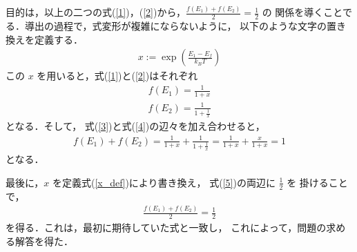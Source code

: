                 目的は，以上の二つの式(\ref{1})，(\ref{2})から，$\displaystyle\frac{f(E_{1})+f(E_{2})}{2}=\frac{1}{2}$ の
                関係を導くことでる．導出の過程で，式変形が複雑にならないように，
                以下のような文字の置き換えを定義する．
                \begin{align}\label{x_def}
                x:=\exp\left(\frac{E_{1}-E_{f}}{k_{B}T}\right)
                \end{align}
                この $x$ を用いると，式(\ref{1})と(\ref{2})はそれぞれ
                \begin{align}\label{3}
                f(E_{1})=\frac{1}{1+x}
                \end{align}
                \begin{align}\label{4}
                f(E_{2})=\frac{1}{1+\frac{1}{x}}
                \end{align}
                となる．そして，
                式(\ref{3})と式(\ref{4})の辺々を加え合わせると，
                \begin{align}\label{5}
                f(E_{1})+f(E_{2})=\frac{1}{1+x}+\frac{1}{1+\frac{1}{x}}=\frac{1}{1+x}+\frac{x}{1+x}=1
                \end{align}
                となる．

                最後に，$x$ を定義式(\ref{x_def})により書き換え，
                式(\ref{5})の両辺に $\displaystyle\frac{1}{2}$ を
                掛けることで，
                \begin{align*}
                \frac{f(E_{1})+f(E_{2})}{2}=\frac{1}{2}
                \end{align*}
                を得る．これは，最初に期待していた式と一致し，
                これによって，問題の求める解答を得た．



